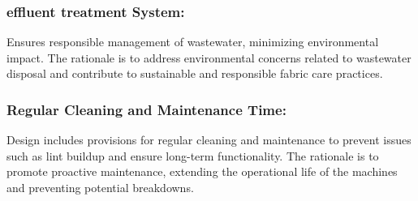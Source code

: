 \documentclass[12pt]{article} %
\begin{document}
 \subsubsection{\Gls{effluent treatment} System:} Ensures responsible management of wastewater, minimizing environmental impact. The rationale is to address environmental concerns related to wastewater disposal and contribute to sustainable and responsible fabric care practices.
 
 \subsubsection{Regular Cleaning and Maintenance Time:} Design includes provisions for regular cleaning and maintenance to prevent issues such as lint buildup and ensure long-term functionality. The rationale is to promote proactive maintenance, extending the operational life of the machines and preventing potential breakdowns.


    


\newpage
\end{document}
